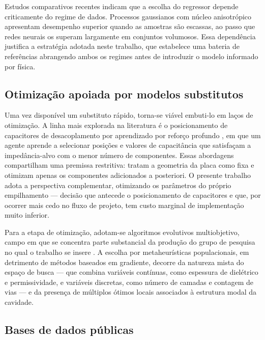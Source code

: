 Estudos comparativos recentes indicam que a escolha do regressor depende
criticamente do regime de dados. Processos gaussianos com núcleo anisotrópico
apresentam desempenho superior quando as amostras são escassas, ao passo que
redes neurais os superam largamente em conjuntos volumosos. Essa dependência
justifica a estratégia adotada neste trabalho, que estabelece uma bateria de
referências abrangendo ambos os regimes antes de introduzir o modelo informado
por física.

\subsection{Otimização apoiada por modelos substitutos}

Uma vez disponível um substituto rápido, torna-se viável embuti-lo em laços de
otimização. A linha mais explorada na literatura é o posicionamento de
capacitores de desacoplamento por aprendizado por reforço profundo
\citep{zhang2020decap,duan2024}, em que um agente aprende a selecionar posições e
valores de capacitância que satisfaçam a impedância-alvo com o menor número de
componentes. Essas abordagens compartilham uma premissa restritiva: tratam a
geometria da placa como fixa e otimizam apenas os componentes adicionados a
posteriori. O presente trabalho adota a perspectiva complementar, otimizando os
parâmetros do próprio empilhamento — decisão que antecede o posicionamento de
capacitores e que, por ocorrer mais cedo no fluxo de projeto, tem custo marginal
de implementação muito inferior.

Para a etapa de otimização, adotam-se algoritmos evolutivos multiobjetivo, campo
em que se concentra parte substancial da produção do grupo de pesquisa no qual o
trabalho se insere \citep{coelho2010,takara2026}. A escolha por metaheurísticas
populacionais, em detrimento de métodos baseados em gradiente, decorre da
natureza mista do espaço de busca — que combina variáveis contínuas, como
espessura de dielétrico e permissividade, e variáveis discretas, como número de
camadas e contagem de vias — e da presença de múltiplos ótimos locais associados
à estrutura modal da cavidade.

\subsection{Bases de dados públicas}

